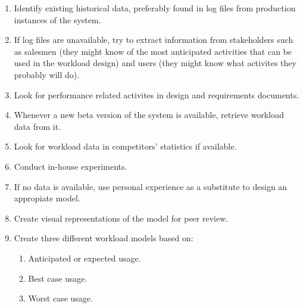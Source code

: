 \begin{enumerate}
  \item Identify existing historical data, preferably found in log files from
    production instances of the system.
  \item If log files are unavailable, try to extract information from
    stakeholders such as salesmen (they might know of the most anticipated
    activities that can be used in the workload design) and users (they might
    know what activites they probably will do).
  \item Look for performance related activites in design and requirements
    documents.
  \item Whenever a new beta version of the system is available, retrieve
    workload data from it.
  \item Look for workload data in competitors' statistics if available.
  \item Conduct in-house experiments.
  \item If no data is available, use personal experience as a substitute to
    design an appropiate model.
  \item Create visual representations of the model for peer review.
  \item Create three different workload models based on:
    \begin{enumerate}
      \item Anticipated or expected usage.
      \item Best case usage.
      \item Worst case usage.
    \end{enumerate}
\end{enumerate}

